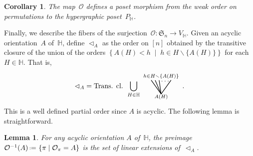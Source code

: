 \documentclass{amsart}
\newtheorem{corollary}[theorem]{Corollary}
\newtheorem{lemma}[theorem]{Lemma}
\theoremstyle{definition}
\newcommand{\set}[2]{\left\{ #1 \;\middle|\; #2 \right\}} %
\newcommand{\ssm}{\smallsetminus} %
\newcommand{\eqdef}{\mbox{\,\raisebox{0.2ex}{\scriptsize\ensuremath{\mathrm:}}\ensuremath{=}\,}} %
\newcommand{\fS}{\mathfrak{S}} %
\newcommand{\less}{\vartriangleleft} %
\newcommand{\Or}{\mathcal O}  %
\newcommand{\HH}{\mathbb H}  %
\begin{document}
\begin{corollary}
\label{coro:weakToP}
The map~$\Or$ defines a poset morphism from the weak order on permutations to the hypergraphic poset~$P_\HH$.
\end{corollary}

Finally, we describe the fibers of the surjection~$\Or : \fS_n \to V_\HH$.
Given an acyclic orientation~$A$ of~$\HH$, define $\less_A$ as the order on $[n]$ obtained by the transitive closure of the union of the \linebreak orders $\set{A(H) < h}{h \in H \ssm \{A(H)\}}$ for each $H \in \HH$.
That is,
\[ 
	{\less_A} =  \text{Trans. cl. }
	\bigcup_{H \in \HH} 
	\begin{tikzpicture}[scale=1,baseline=.0cm]
		\node at (0,-.45) {$\scriptstyle A(H)$};
		\node at (0,.6) {$\scriptstyle h \in H \ssm \{A(H)\}$};
		\node at (.2,.35) {$\ldots$};
		\draw [thick] (0,-.3)--(-.5,.4); 
		\draw [thick] (0,-.3)--(-.3,.4); 
		\draw [thick] (0,-.3)--(-.1,.4); 
		\draw [thick] (0,-.3)--(.5,.4); 
	\end{tikzpicture} \,.
\]
This is a well defined partial order since $A$ is acyclic.
The following lemma is straightforward.

\begin{lemma}
\label{lem:prepi}
For any acyclic orientation $A$ of~$\HH$, the preimage $\Or^{-1}(A) \eqdef \set{\pi}{\Or_\pi=A}$ is the set of linear extensions of~$\less_A$.
\end{lemma}
\end{document}

